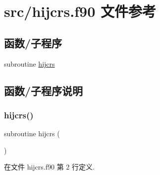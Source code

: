 \hypertarget{hijcrs_8f90}{}\section{src/hijcrs.f90 文件参考}
\label{hijcrs_8f90}
\subsection*{函数/子程序}
\begin{DoxyCompactItemize}
\item 
subroutine \mbox{\hyperlink{hijcrs_8f90_a9aa6779b47b0a9cbc14d258c88676ccd}{hijcrs}}
\end{DoxyCompactItemize}


\subsection{函数/子程序说明}
\mbox{\label{hijcrs_8f90_a9aa6779b47b0a9cbc14d258c88676ccd}} 
\subsubsection{\texorpdfstring{hijcrs()}{hijcrs()}}
{\footnotesize\ttfamily subroutine hijcrs (\begin{DoxyParamCaption}{ }\end{DoxyParamCaption})}



在文件 hijcrs.\+f90 第 2 行定义.

